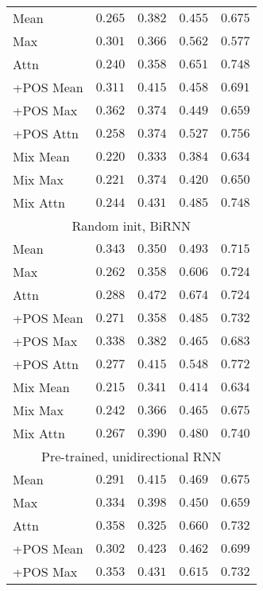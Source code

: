 \begin{table}
\begin{tabular}{lrrrr}
    Mean & $0.265$ & $0.382$ & $0.455$ & $0.675$ \\
    Max & $0.301$ & $0.366$ & $0.562$ & $0.577$ \\
    Attn & $0.240$ & $0.358$ & $0.651$ & $0.748$ \\
    +POS Mean & $0.311$ & $0.415$ & $0.458$ & $0.691$ \\
    +POS Max & $0.362$ & $0.374$ & $0.449$ & $0.659$ \\
    +POS Attn & $0.258$ & $0.374$ & $0.527$ & $0.756$ \\
    Mix Mean & $0.220$ & $0.333$ & $0.384$ & $0.634$ \\
    Mix Max & $0.221$ & $0.374$ & $0.420$ & $0.650$ \\
    Mix Attn & $0.244$ & $0.431$ & $0.485$ & $0.748$ \\
    \midrule \multicolumn{5}{c}{Random init, BiRNN} \\ \midrule
    Mean & $0.343$ & $0.350$ & $0.493$ & $0.715$ \\
    Max & $0.262$ & $0.358$ & $0.606$ & $0.724$ \\
    Attn & $0.288$ & $\mathbf{0.472}$ & $\mathbf{0.674}$ & $0.724$ \\
    +POS Mean & $0.271$ & $0.358$ & $0.485$ & $0.732$ \\
    +POS Max & $0.338$ & $0.382$ & $0.465$ & $0.683$ \\
    +POS Attn & $0.277$ & $0.415$ & $0.548$ & $\mathbf{0.772}$ \\
    Mix Mean & $0.215$ & $0.341$ & $0.414$ & $0.634$ \\
    Mix Max & $0.242$ & $0.366$ & $0.465$ & $0.675$ \\
    Mix Attn & $0.267$ & $0.390$ & $0.480$ & $0.740$ \\
    \midrule \multicolumn{5}{c}{Pre-trained, unidirectional RNN} \\ \midrule
    Mean & $0.291$ & $0.415$ & $0.469$ & $0.675$ \\
    Max & $0.334$ & $0.398$ & $0.450$ & $0.659$ \\
    Attn & $0.358$ & $0.325$ & $0.660$ & $0.732$ \\
    +POS Mean & $0.302$ & $0.423$ & $0.462$ & $0.699$ \\
    +POS Max & $0.353$ & $0.431$ & $0.615$ & $0.732$ \\

\end{tabular}
\end{table}
